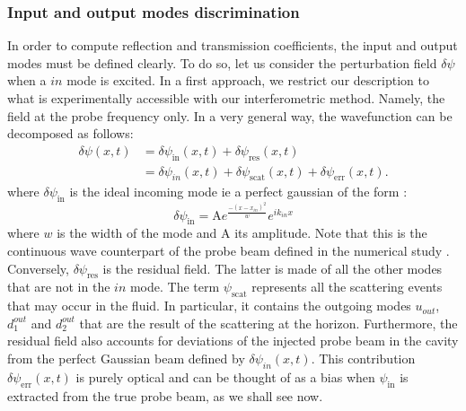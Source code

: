 \subsubsection{Input and output modes discrimination}
In order to compute reflection and transmission coefficients, the input and output modes must be defined clearly.
To do so, let us consider the perturbation field $\delta\psi$ when a $in$ mode is excited. In a first approach, we restrict our description to what is experimentally accessible with our interferometric method.
Namely, the field at the probe frequency only. In a very general way, the wavefunction can be decomposed as follows:
\begin{equation}
    \begin{aligned}
    \delta\psi(x,t) &= \delta \psi_\mathrm{in}(x,t)+\delta \psi_\mathrm{res}(x,t) \\
    &= \delta \psi_{in}(x,t) + \delta \psi_\mathrm{scat}(x,t) + \delta \psi_\mathrm{err}(x,t).
    \end{aligned}
\label{eq:scat_decomp}
\end{equation}
where $\delta \psi_\mathrm{in}$ is the ideal incoming mode ie a perfect gaussian of the form :
\begin{equation}
\delta \psi_\mathrm{in}= \mathrm{A} e^{\frac{-(x-x_{in})^2}{w}}e^{ik_{in}x}
\end{equation}
where $w$ is the width of the mode and A its amplitude. Note that this is the continuous wave counterpart of the probe beam defined in the numerical study \cite{carusotto_fluidlightproposal_2012}.
Conversely, $\delta \psi_\mathrm{res}$ is the residual field. The latter is made of all the other modes that are not in the $in$ mode. The term $\psi_\mathrm{scat}$ represents all the scattering events that may occur in the fluid. In particular, it contains the outgoing modes $u_{out}$, $d_1^{out}$ and $d_2^{out}$ that are the result of the scattering at the horizon. Furthermore, the residual field also accounts for deviations
of the injected probe beam in the cavity from the perfect Gaussian beam defined by $\delta \psi_{in}(x,t)$. This contribution $\delta \psi_\mathrm{err}(x,t)$ is purely optical and can be thought of as a bias when $\psi_\mathrm{in}$ is extracted from the true probe beam, as we shall see now.

\bigskip

